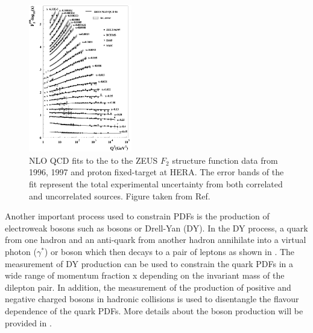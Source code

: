 \begin{figure}[!htbp]
 \begin{center}
  \includegraphics[width=0.4\textwidth]{Figures/Introduction/StandardModel/Structure_Function.png}
 \end{center}
\caption{NLO QCD fits to the to the ZEUS $F_{2}$ structure function data from 1996, 1997 and proton fixed-target at HERA. The error bands of the fit represent the total experimental uncertainty from both correlated and uncorrelated sources. Figure taken from Ref.~\cite{HERAStrucFunc}}
 \label{fig:HERAStrucFunc}
\end{figure}

Another important process used to constrain PDFs is the production of electroweak bosons such as {\PW} bosons or Drell-Yan (DY). In the DY process, a quark from one hadron and an anti-quark from another hadron annihilate into a virtual photon ($\gamma^{*}$) or {\PZ} boson which then decays to a pair of leptons as shown in . The measurement of DY production can be used to constrain the quark PDFs in a wide range of momentum fraction x depending on the invariant mass of the dilepton pair. In addition, the measurement of the production of positive and negative charged {\PW} bosons in hadronic collisions is used to disentangle the flavour dependence of the quark PDFs. More details about the {\PW} boson production will be provided in .

